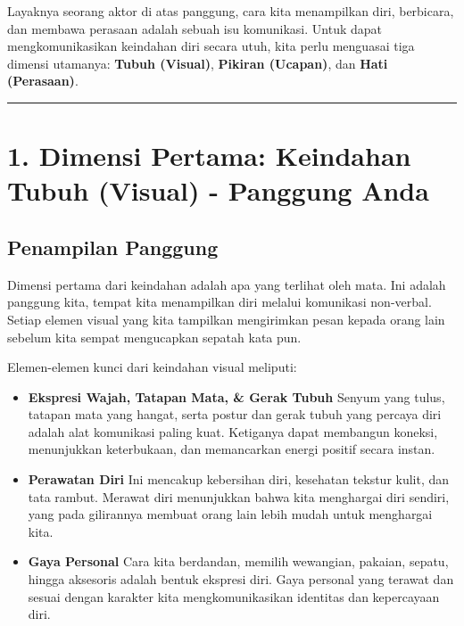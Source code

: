 \documentclass[
  letterpaper,
  DIV=11,
  numbers=noendperiod]{scrreprt}
\begin{document}
Layaknya seorang aktor di atas panggung, cara kita menampilkan diri,
berbicara, dan membawa perasaan adalah sebuah isu komunikasi. Untuk
dapat mengkomunikasikan keindahan diri secara utuh, kita perlu menguasai
tiga dimensi utamanya: \textbf{Tubuh (Visual)}, \textbf{Pikiran
(Ucapan)}, dan \textbf{Hati (Perasaan)}.

\begin{center}\rule{0.5\linewidth}{0.5pt}\end{center}

\section{1. Dimensi Pertama: Keindahan Tubuh (Visual) - Panggung
Anda}\label{dimensi-pertama-keindahan-tubuh-visual---panggung-anda}

\subsection{Penampilan Panggung}\label{penampilan-panggung}

Dimensi pertama dari keindahan adalah apa yang terlihat oleh mata. Ini
adalah panggung kita, tempat kita menampilkan diri melalui komunikasi
non-verbal. Setiap elemen visual yang kita tampilkan mengirimkan pesan
kepada orang lain sebelum kita sempat mengucapkan sepatah kata pun.

Elemen-elemen kunci dari keindahan visual meliputi:

\begin{itemize}
\item
  \textbf{Ekspresi Wajah, Tatapan Mata, \& Gerak Tubuh} Senyum yang
  tulus, tatapan mata yang hangat, serta postur dan gerak tubuh yang
  percaya diri adalah alat komunikasi paling kuat. Ketiganya dapat
  membangun koneksi, menunjukkan keterbukaan, dan memancarkan energi
  positif secara instan.
\item
  \textbf{Perawatan Diri} Ini mencakup kebersihan diri, kesehatan
  tekstur kulit, dan tata rambut. Merawat diri menunjukkan bahwa kita
  menghargai diri sendiri, yang pada gilirannya membuat orang lain lebih
  mudah untuk menghargai kita.
\item
  \textbf{Gaya Personal} Cara kita berdandan, memilih wewangian,
  pakaian, sepatu, hingga aksesoris adalah bentuk ekspresi diri. Gaya
  personal yang terawat dan sesuai dengan karakter kita
  mengkomunikasikan identitas dan kepercayaan diri.
\end{itemize}
\end{document}
